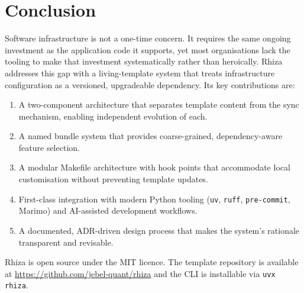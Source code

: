 \documentclass[12pt,a4paper]{article}
\begin{document}
\section{Conclusion}
\label{sec:conclusion}

Software infrastructure is not a one-time concern. It requires the same ongoing investment as the application code it supports, yet most organisations lack the tooling to make that investment systematically rather than heroically. Rhiza addresses this gap with a living-template system that treats infrastructure configuration as a versioned, upgradeable dependency. Its key contributions are:

\begin{enumerate}[leftmargin=*]
  \item A two-component architecture that separates template content from the sync mechanism, enabling independent evolution of each.
  \item A named bundle system that provides coarse-grained, dependency-aware feature selection.
  \item A modular Makefile architecture with hook points that accommodate local customisation without preventing template updates.
  \item First-class integration with modern Python tooling (\texttt{uv}, \texttt{ruff}, \texttt{pre-commit}, Marimo) and AI-assisted development workflows.
  \item A documented, ADR-driven design process that makes the system's rationale transparent and revisable.
\end{enumerate}

Rhiza is open source under the MIT licence. The template repository is available at \url{https://github.com/jebel-quant/rhiza} and the CLI is installable via \texttt{uvx rhiza}.
\end{document}
